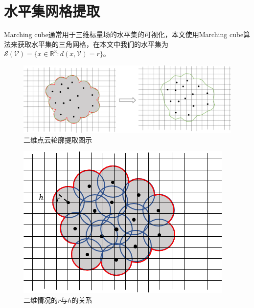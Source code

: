 \section{水平集网格提取}
Marching cube通常用于三维标量场的水平集的可视化，本文使用Marching cube算法来获取水平集的三角网格，在本文中我们的水平集为
$\mathcal{S}(\mathcal{V}) = \{x\in \mathbb{R}^3: d(x,\mathcal{V}) = r\}$。


\begin{figure}[htbp]
    \centering
    \includegraphics[scale=0.3]{./images/image7.png}
    \caption{二维点云轮廓提取图示}
    \label{fig:2D marching cube}
\end{figure}
\begin{figure}[htbp]
    \centering
    \includegraphics[scale=1.0]{./images/image5.png}
    \caption{二维情况的$r$与$h$的关系}
    \label{fig:grid and sphere}
\end{figure}

